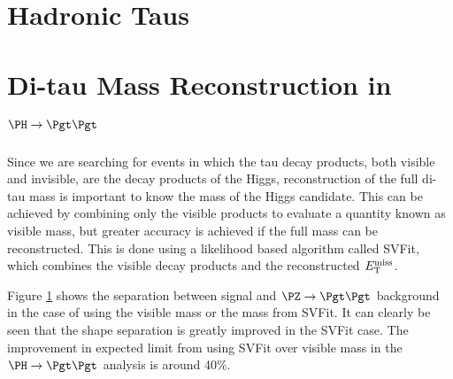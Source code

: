 \section{Hadronic Taus}
\label{sec:taus}

\section{Di-tau Mass Reconstruction in $\PH \to \Pgt\Pgt$}
\label{sec:svfit}

Since we are searching for events in which the tau decay products, both visible
and invisible, are the decay products of the Higgs, reconstruction of the full
di-tau mass is important to know the mass of the Higgs candidate. This can be
achieved by combining only the visible products to evaluate a quantity known as
visible mass, but greater accuracy is achieved if the full mass can be
reconstructed. This is done using a likelihood based algorithm called SVFit,
which combines the visible decay products and the reconstructed
$E_{\mathrm{T}}^{\text{miss}}$.

Figure \ref{fig:svfit} shows the separation between signal and $\PZ \to \Pgt\Pgt$
background in the case of using the visible mass or the mass from SVFit. It can
clearly be seen that the shape separation is greatly improved in the SVFit case.
The improvement in expected limit from using SVFit over visible mass in the $\PH
\to \Pgt\Pgt$ analysis is around 40$\%$.


\begin{figure}
\begin{center}
\end{center}
\caption{
}
\label{fig:svfit}
\end{figure}

